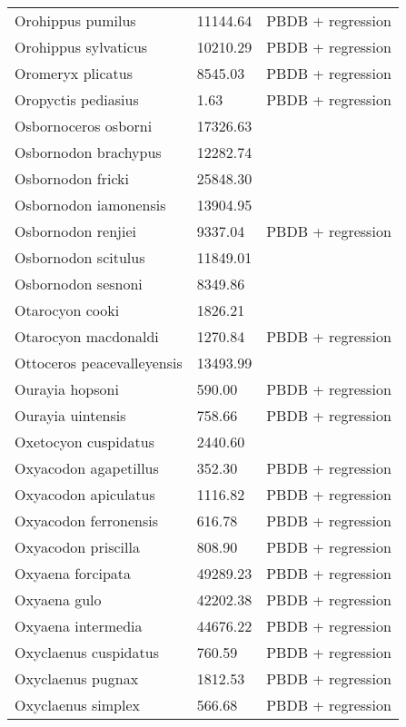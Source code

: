 \documentclass{article}
\begin{document}
\begin{center}
\begin{longtable}{p{} p{} p{}}
    Orohippus pumilus & 11144.64 & PBDB + regression \\ 
    Orohippus sylvaticus & 10210.29 & PBDB + regression \\ 
    Oromeryx plicatus & 8545.03 & PBDB + regression \\ 
    Oropyctis pediasius & 1.63 & PBDB + regression \\ 
    Osbornoceros osborni & 17326.63 & \cite{Tomiya2013} \\ 
    Osbornodon brachypus & 12282.74 & \cite{Chester2012} \\ 
    Osbornodon fricki & 25848.30 & \cite{Tomiya2013} \\ 
    Osbornodon iamonensis & 13904.95 & \cite{Tomiya2013} \\ 
    Osbornodon renjiei & 9337.04 & PBDB + regression \\ 
    Osbornodon scitulus & 11849.01 & \cite{Tomiya2013} \\ 
    Osbornodon sesnoni & 8349.86 & \cite{Tomiya2013} \\ 
    Otarocyon cooki & 1826.21 & \cite{Tomiya2013} \\ 
    Otarocyon macdonaldi & 1270.84 & PBDB + regression \\ 
    Ottoceros peacevalleyensis & 13493.99 & \cite{Tomiya2013} \\ 
    Ourayia hopsoni & 590.00 & PBDB + regression \\ 
    Ourayia uintensis & 758.66 & PBDB + regression \\ 
    Oxetocyon cuspidatus & 2440.60 & \cite{Tomiya2013} \\ 
    Oxyacodon agapetillus & 352.30 & PBDB + regression \\ 
    Oxyacodon apiculatus & 1116.82 & PBDB + regression \\ 
    Oxyacodon ferronensis & 616.78 & PBDB + regression \\ 
    Oxyacodon priscilla & 808.90 & PBDB + regression \\ 
    Oxyaena forcipata & 49289.23 & PBDB + regression \\ 
    Oxyaena gulo & 42202.38 & PBDB + regression \\ 
    Oxyaena intermedia & 44676.22 & PBDB + regression \\ 
    Oxyclaenus cuspidatus & 760.59 & PBDB + regression \\ 
    Oxyclaenus pugnax & 1812.53 & PBDB + regression \\ 
    Oxyclaenus simplex & 566.68 & PBDB + regression \\ 

\end{longtable}
\end{center}
\end{document}
